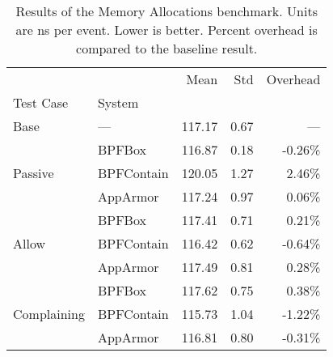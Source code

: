 \begin{table}[ht!]
\centering
\footnotesize
\caption[Results of the Memory Allocations benchmark]{Results of the Memory Allocations benchmark. Units are ns per event. Lower is better. Percent overhead is compared to the baseline result.}
\label{tab:phoronix-memory-allocations}
\begin{tabular}{llrrr}
\toprule
            &          &    Mean &   Std & Overhead \\
Test Case & System &         &       &          \\
\midrule
Base & --- &  117.17 &  0.67 &      --- \\
\cline{1-5}
\multirow{3}{*}{Passive} & BPFBox &  116.87 &  0.18 &  -0.26\% \\
            & BPFContain &  120.05 &  1.27 &   2.46\% \\
            & AppArmor &  117.24 &  0.97 &   0.06\% \\
\cline{1-5}
\multirow{3}{*}{Allow} & BPFBox &  117.41 &  0.71 &   0.21\% \\
            & BPFContain &  116.42 &  0.62 &  -0.64\% \\
            & AppArmor &  117.49 &  0.81 &   0.28\% \\
\cline{1-5}
\multirow{3}{*}{Complaining} & BPFBox &  117.62 &  0.75 &   0.38\% \\
            & BPFContain &  115.73 &  1.04 &  -1.22\% \\
            & AppArmor &  116.81 &  0.80 &  -0.31\% \\
\bottomrule
\end{tabular}
\end{table}
